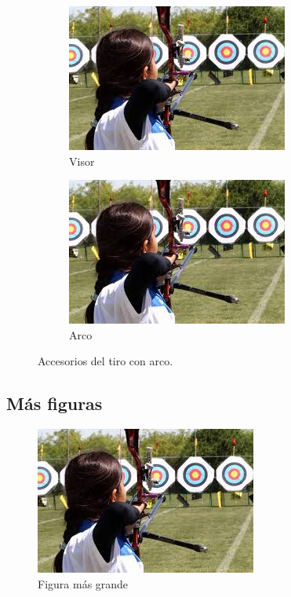 \documentclass[12pt, legalpaper]{article}
\begin{document}
\begin{figure}[H]
    \begin{subfigure}{0.45\textwidth} %
        \centering
        \includegraphics[scale=.35, angle=0]{tiro_arco.jpg}
        \caption{Visor}
        \label{c}
    \end{subfigure}
    \begin{subfigure}{0.45\textwidth}
        \centering
        \includegraphics[scale=.35, angle=0]{tiro_arco.jpg}
        \caption{Arco}
        \label{c}
    \end{subfigure}
    \caption{Accesorios del tiro con arco.}
\end{figure}

\subsection{Más figuras}

\newpage

\begin{landscape}
    \begin{figure}[H]
        \centering
        \includegraphics[scale=.35, angle=0]{tiro_arco.jpg}
        \caption{Figura más grande}
        \label{fig:enter-label}
    \end{figure}
\end{landscape}
\end{document}
